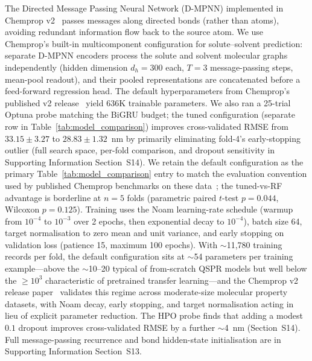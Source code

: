 \documentclass[journal=jcisd8,manuscript=article]{achemso}
\newcommand{\added}[1]{{\color{addedblue}#1}}
\begin{document}
\added{The Directed Message Passing Neural Network (D-MPNN) implemented in Chemprop v2~\cite{yangAnalyzingLearnedMolecular2019,chempropv2_2024} passes messages along directed bonds (rather than atoms), avoiding redundant information flow back to the source atom. We use Chemprop's built-in multicomponent configuration for solute--solvent prediction: separate D-MPNN encoders process the solute and solvent molecular graphs independently (hidden dimension $d_h = 300$ each, $T = 3$ message-passing steps, mean-pool readout), and their pooled representations are concatenated before a feed-forward regression head. The default hyperparameters from Chemprop's published v2 release~\cite{yangAnalyzingLearnedMolecular2019,chempropv2_2024} yield 636K trainable parameters. We also ran a 25-trial Optuna probe matching the BiGRU budget; the tuned configuration (separate row in Table~\ref{tab:model_comparison}) improves cross-validated RMSE from $33.15 \pm 3.27$ to $28.83 \pm 1.32$~nm by primarily eliminating fold-4's early-stopping outlier (full search space, per-fold comparison, and dropout sensitivity in Supporting Information Section~S14). We retain the default configuration as the primary Table~\ref{tab:model_comparison} entry to match the evaluation convention used by published Chemprop benchmarks on these data~\cite{joung2021deep,beard2019comparative,greenman2022multifidelity,jung2024machine,chempropv2_2024}; the tuned-vs-RF advantage is borderline at $n = 5$ folds (parametric paired $t$-test $p = 0.044$, Wilcoxon $p = 0.125$). Training uses the Noam learning-rate schedule (warmup from $10^{-4}$ to $10^{-3}$ over 2 epochs, then exponential decay to $10^{-4}$), batch size 64, target normalisation to zero mean and unit variance, and early stopping on validation loss (patience 15, maximum 100 epochs). With $\sim$11{,}780 training records per fold, the default configuration sits at $\sim$54 parameters per training example---above the $\sim$10--20 typical of from-scratch QSPR models but well below the $\geq 10^3$ characteristic of pretrained transfer learning---and the Chemprop v2 release paper~\cite{chempropv2_2024} validates this regime across moderate-size molecular property datasets, with Noam decay, early stopping, and target normalisation acting in lieu of explicit parameter reduction. The HPO probe finds that adding a modest $0.1$ dropout improves cross-validated RMSE by a further $\sim$4~nm (Section~S14). Full message-passing recurrence and bond hidden-state initialisation are in Supporting Information Section~S13.}


\end{document}
